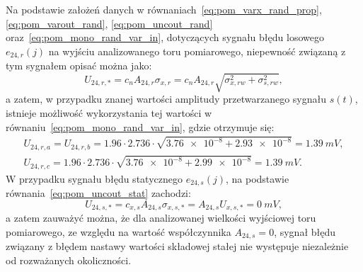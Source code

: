 Na podstawie założeń danych w równaniach~\eqref{eq:pom_varx_rand_prop}, \eqref{eq:pom_varout_rand}, \eqref{eq:pom_uncout_rand} oraz~\eqref{eq:pom_mono_rand_var_in}, dotyczących sygnału błędu losowego $e_{24,r}(j)$ na wyjściu analizowanego toru pomiarowego, niepewność związaną z tym sygnałem opisać można jako:
\begin{equation}
U_{24,r,*} = c_{n} A_{24,r} \sigma_{x,r} = c_{n} A_{24,r} \sqrt{\sigma_{x,rw}^{2} + \sigma_{s,rw}^{2}} \label{eq:pom_mono_unc_rand_all},
\end{equation}
a zatem, w przypadku znanej wartości amplitudy przetwarzanego sygnału $s(t)$, istnieje możliwość wykorzystania tej wartości w równaniu~\eqref{eq:pom_mono_rand_var_in}, gdzie otrzymuje się:
\begin{gather}
U_{24,r,a} = U_{24,r,b} = \num{1.96} \cdot \num{2.736} \cdot \sqrt{\num{3.76e-8} + \num{2.93e-8}} = \qty{1.39}{mV} \label{eq:pom_mono_unc_rand_ab}, \\
U_{24,r,c} = \num{1.96} \cdot \num{2.736} \cdot \sqrt{\num{3.76e-8} + \num{2.99e-8}} = \qty{1.39}{mV} \label{eq:pom_mono_unc_rand_c}.
\end{gather}
W przypadku sygnału błędu statycznego $e_{24,s}(j)$, na podstawie równania~\eqref{eq:pom_uncout_stat} zachodzi:
\begin{equation}
U_{24,s,*} = c_{x,s} A_{24,s} \sigma_{x,s,*} = A_{24,s} U_{x,s,*} = \qty{0}{mV} \label{eq:pom_mono_unc_static_all},
\end{equation}
a zatem zauważyć można, że dla analizowanej wielkości wyjściowej toru pomiarowego, ze względu na wartość współczynnika $A_{24,s} = 0$, sygnał błędu związany z błędem nastawy wartości składowej stałej nie występuje niezależnie od rozważanych okoliczności.

